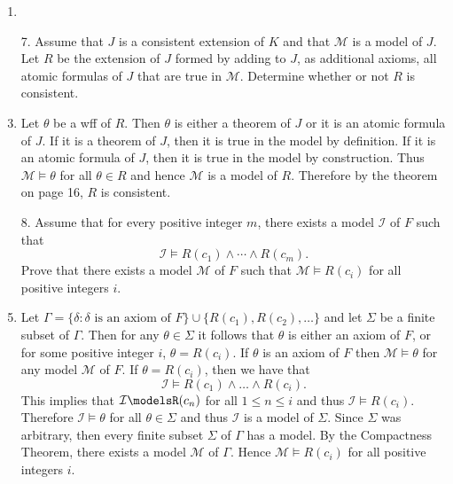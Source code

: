 \documentclass[12pt]{article}
\makeatletter
\theoremstyle{definition}
\theoremstyle{remark}
\renewenvironment{proof}[1][\proofname]{\par
  \pushQED{\qed}%
  \normalfont \topsep6\p@\@plus6\p@\relax
  \list{}{\leftmargin=0mm
          \rightmargin=4mm
          \settowidth{\itemindent}{\itshape#1}%
          \labelwidth=\itemindent
          \parsep=0pt \listparindent=\parindent 
  }
  \item[\hskip\labelsep
        \itshape
    #1\@addpunct{.}]\ignorespaces
}{%
  \popQED\endlist\@endpefalse
}
\let\oldproofname=\proofname
\renewcommand{\proofname}{\bf{\textit{\oldproofname}}}
\makeatother
\begin{document}
\begin{enumerate}[leftmargin=*]
\begin{proof}
            \end{proof}
        \item[7.] Assume that $J$ is a consistent extension of $K$ and that $\mathcal{M}$ is a model of $J$. Let $R$ be the extension of $J$ formed by adding to $J$, as additional axioms, all atomic formulas of $J$ that are true in $\mathcal{M}$. Determine whether or not $R$ is consistent.
            \begin{proof}
                Let $\theta$ be a wff of $R$. Then $\theta$ is either a theorem of $J$ or it is an atomic formula of $J$. If it is a theorem of $J$, then it is true in the model by definition. If it is an atomic formula of $J$, then it is true in the model by construction. Thus $\mathcal{M}\models\theta$ for all $\theta\in R$ and hence $\mathcal{M}$ is a model of $R$. Therefore by the theorem on page 16, $R$ is consistent.
            \end{proof}
        \item[8.] Assume that for every positive integer $m$, there exists a model $\mathcal{I}$ of $F$ such that 
            \begin{equation*}
                \mathcal{I}\models R(c_1)\land\cdots\land R(c_m).
            \end{equation*}
            Prove that there exists a model $\mathcal{M}$ of $F$ such that $\mathcal{M}\models R(c_i)$ for all positive integers $i$. 
            \begin{proof}
                Let $\Gamma=\{\delta\colon \delta\text{ is an axiom of }F\}\cup\{R(c_1),R(c_2),\dots\}$ and let $\Sigma$ be a finite subset of $\Gamma$. Then for any $\theta\in\Sigma$ it follows that $\theta$ is either an axiom of $F$, or for some positive integer $i$, $\theta=R(c_i)$. If $\theta$ is an axiom of $F$ then $\mathcal{M}\models\theta$ for any model $\mathcal{M}$ of $F$. If $\theta=R(c_i)$, then we have that
                    \begin{equation*}
                        \mathcal{I}\models R(c_1)\land\dots\land R(c_i).
                    \end{equation*}
                This implies that $\mathcal{I}\modelsR(c_n)$ for all $1\leq n\leq i$ and thus $\mathcal{I}\models R(c_i)$. Therefore $\mathcal{I}\models\theta$ for all $\theta\in\Sigma$ and thus $\mathcal{I}$ is a model of $\Sigma$. Since $\Sigma$ was arbitrary, then every finite subset $\Sigma$ of $\Gamma$ has a model. By the Compactness Theorem, there exists a model $\mathcal{M}$ of $\Gamma$. Hence $\mathcal{M}\models R(c_i)$ for all positive integers $i$.

\end{proof}
\end{enumerate}
\end{document}
